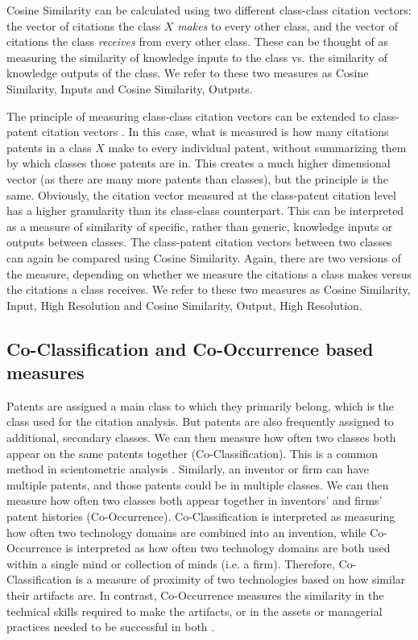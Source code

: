 \documentclass[]{svjour3}
\begin{document}
Cosine Similarity can be calculated using two different class-class citation vectors: the vector of citations the class $X$ \textit{makes} to every other class, and the vector of citations the class \textit{receives} from every other class. These can be thought of as measuring the similarity of knowledge inputs to the class vs. the similarity of knowledge outputs of the class. We refer to these two measures as Cosine Similarity, Inputs and Cosine Similarity, Outputs.

The principle of measuring class-class citation vectors can be extended to class-patent citation vectors \citep{Yan2015}. In this case, what is measured is how many citations patents in a class $X$ make to every individual patent, without summarizing them by which classes those patents are in. This creates a much higher dimensional vector (as there are many more patents than classes), but the principle is the same. Obviously, the citation vector measured at the class-patent citation level has a higher granularity than its class-class counterpart. This can be interpreted as a measure of similarity of specific, rather than generic, knowledge inputs or outputs between classes. The class-patent citation vectors between two classes can again be compared using Cosine Similarity. Again, there are two versions of the measure, depending on whether we measure the citations a class makes versus the citations a class receives. We refer to these two measures as Cosine Similarity, Input, High Resolution and Cosine Similarity, Output, High Resolution. 

\subsection{Co-Classification and Co-Occurrence based measures}
Patents are assigned a main class to which they primarily belong, which is the class used for the citation analysis. But patents are also frequently assigned to additional, secondary classes. We can then measure how often two classes both appear on the same patents together (Co-Classification). This is a common method in scientometric analysis \citep{Jeong2015, Dolfsma2011, Joo2010, Joo2009, Leydesdorff2008, Engelsman1994}. Similarly, an inventor or firm can have multiple patents, and those patents could be in multiple classes. We can then measure how often two classes both appear together in inventors' and firms' patent histories (Co-Occurrence).  Co-Classification is interpreted as measuring how often two technology domains are combined into an invention, while Co-Occurrence is interpreted as how often two technology domains are both used within a single mind or collection of minds (i.e. a firm). Therefore, Co-Classification is a measure of proximity of two technologies based on how similar their artifacts are. In contrast, Co-Occurrence measures the similarity in the technical skills required to make the artifacts, or in the assets or managerial practices needed to be successful in both \citep{Bryce2009, Bottazzi2010, Teece1994}.
\end{document}
